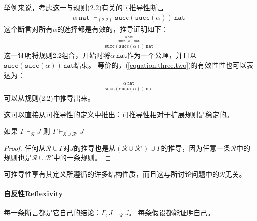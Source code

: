 举例来说，考虑这一与规则(2.2)有关的可推导性断言
\begin{equation}
    \begin{aligned} %
        \alpha \ \mathtt{nat} \ \vdash_{(2.2)} \mathtt{succ}(\mathtt{succ}(\alpha)) \ \mathtt{nat} \label{equation:three.two}
    \end{aligned}
\end{equation}
这个断言对所有$\alpha$的选择都是有效的，推导证明如下：
\begin{equation}
    \begin{aligned} %
        \frac{\frac{\alpha \  \mathtt{nat}}{\mathtt{succ}(\alpha)  \  \mathtt{nat}}}{\mathtt{succ}(\mathtt{succ}(\alpha)) \  \mathtt{nat}} \label{equation:three.three}
    \end{aligned}
\end{equation}
这一证明将规则2.2组合，开始时将$\alpha \  \mathtt{nat}$作为一个公理，并且以$\mathtt{succ}(\mathtt{succ}(\alpha)) \  \mathtt{nat}$结束。
等价的，(\ref{equation:three.two})的有效性性也可以表达为：
\begin{equation}
    \begin{aligned} %
        \frac{\alpha \ \mathtt{nat}}{\mathtt{succ}(\mathtt{succ}(\alpha))  \ \mathtt{nat}}
    \end{aligned}
\end{equation}
可以从规则(2.2)中推导出来。

这可以直接从可推导性的定义中推出：可推导性相对于扩展规则是稳定的。

\begin{theorem}[稳定性]\label{theorem:stability}
    如果 $\Gamma \vdash_{\mathcal{R}} J$ 则 $\Gamma \vdash_{\mathcal{R} \cup \mathcal{R}'} J$
\end{theorem}
\begin{proof}
    任何从$\mathcal{R}\cup \Gamma$对$J$的推导也是从$(\mathcal{R} \cup \mathcal{R}') \cup \Gamma$的推导，因为任意一条$\mathcal{R}$中的规则也是$\mathcal{R} \cup \mathcal{R}'$中的一条规则。
    \end{proof}
可推导性享有其定义所遵循的许多结构性质，而且这与所讨论问题中的$\mathcal{R}$无关。

\paragraph{自反性Reflexivity} 
每一条断言都是它自己的结论：$\Gamma,J\vdash_{\mathcal{R}}J$。
每条假设都能证明自己。

